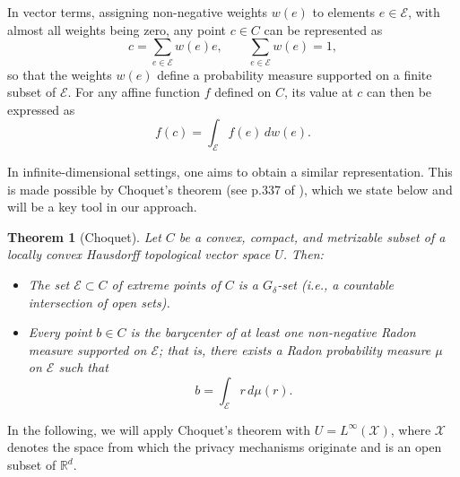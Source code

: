 \documentclass[a4paper, 11pt]{article}
\newtheorem{thm}{Theorem}
\theoremstyle{definition}
\newcommand{\R}{{\mathbb{R}}}
\begin{document}
{In vector terms, assigning non-negative weights \( w(e) \) to elements \( e \in \mathcal{E} \), with almost all weights being zero, any point \( c \in C \) can be represented as
\[
c = \sum_{e \in \mathcal{E}} w(e) e, \qquad \sum_{e \in \mathcal{E}} w(e) = 1,
\]
so that the weights \( w(e) \) define a probability measure supported on a finite subset of \( \mathcal{E} \). For any affine function \( f \) defined on \( C \), its value at \( c \) can then be expressed as
\[
f(c) = \int_{\mathcal{E}} f(e) \, dw(e).
\]

In infinite-dimensional settings, one aims to obtain a similar representation. This is made possible by Choquet's theorem (see p.337 of \cite{Choquet}), which we state below and will be a key tool in our approach.

\begin{thm}[Choquet]{\label{th: Choquet}}
Let \( C \) be a convex, compact, and metrizable subset of a locally convex Hausdorff topological vector space \( U \). Then:
\begin{itemize}
    \item The set \( \mathcal{E} \subset C \) of extreme points of \( C \) is a \( G_\delta \)-set (i.e., a countable intersection of open sets).
    \item Every point \( b \in C \) is the barycenter of at least one non-negative Radon measure supported on \( \mathcal{E} \); that is, there exists a Radon probability measure \( \mu \) on \( \mathcal{E} \) such that
  \begin{equation} \label{eq : Choquet representation}
  b = \int_{\mathcal{E}} r \, d\mu(r).
  	\end{equation}
  
\end{itemize}
\end{thm}

In the following, we will apply Choquet's theorem with \( U = L^\infty(\mathcal{X}) \), where \( \mathcal{X} \) denotes the space from which the privacy mechanisms originate and is an open subset of $\R^d$. %

}
\end{document}
